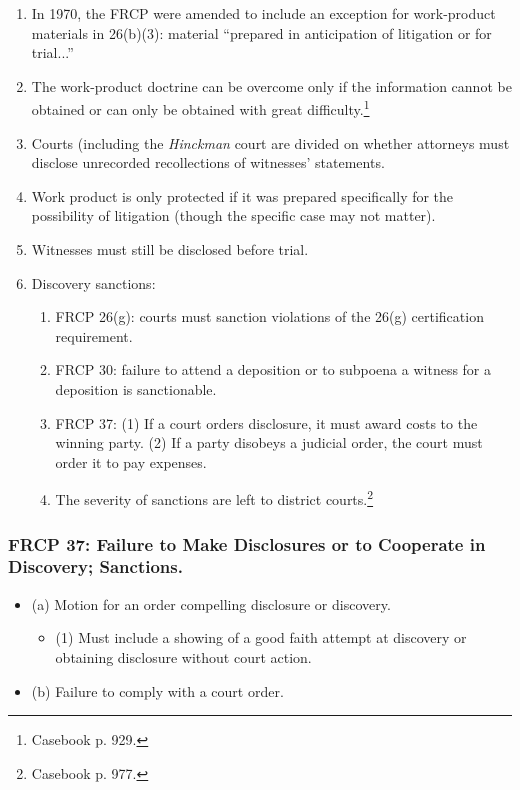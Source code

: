 \begin{enumerate}
    \item In 1970, the FRCP were amended to include an exception for work-product materials in 26(b)(3): material ``prepared in anticipation of litigation or for trial...''
    \item The work-product doctrine can be overcome only if the information cannot be obtained or can only be obtained with great difficulty.\footnote{Casebook p. 929.}
    \item Courts (including the \emph{Hinckman} court are divided on whether attorneys must disclose unrecorded recollections of witnesses' statements.
    \item Work product is only protected if it was prepared specifically for the possibility of litigation (though the specific case may not matter).
    \item Witnesses must still be disclosed before trial.
    \item Discovery sanctions:
    \begin{enumerate}
        \item FRCP 26(g): courts must sanction violations of the 26(g) certification requirement.
        \item FRCP 30: failure to attend a deposition or to subpoena a witness for a deposition is sanctionable.
        \item FRCP 37: (1) If a court orders disclosure, it must award costs to the winning party. (2) If a party disobeys a judicial order, the court must order it to pay expenses.
        \item The severity of sanctions are left to district courts.\footnote{Casebook p. 977.}
    \end{enumerate}
\end{enumerate}


\subsubsection{FRCP 37: Failure to Make Disclosures or to Cooperate in Discovery; Sanctions.}

\begin{itemize}
    \item (a) Motion for an order compelling disclosure or discovery.
    \begin{itemize}
        \item (1) Must include a showing of a good faith attempt at discovery or obtaining disclosure without court action.
    \end{itemize}
    \item (b) Failure to comply with a court order.
\end{itemize}
